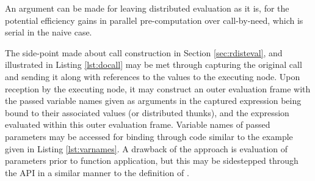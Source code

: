 An argument can be made for leaving distributed evaluation as it is, for the potential efficiency gains in parallel pre-computation over call-by-need, which is serial in the naive case.

The side-point made about call construction in Section \cref{sec:rdisteval}, and illustrated in Listing \cref{lst:docall} may be met through capturing the original call and sending it along with references to the values to the executing node.
Upon reception by the executing node, it may construct an outer evaluation frame with the passed variable names given as arguments in the captured expression being bound to their associated values (or distributed thunks)\cite{ingerman1961thunks}, and the expression evaluated within this outer evaluation frame.
Variable names of passed parameters may be accessed for binding through code similar to the example given in Listing \cref{lst:varnames}.
A drawback of the approach is evaluation of parameters prior to function application, but this may be sidestepped through the  API in a similar manner to the definition of \cite{abelson1996sicp:order}.

